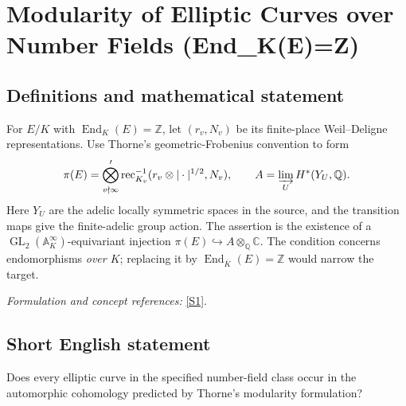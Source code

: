\documentclass[11pt,a4paper]{article}
\newcommand{\Z}{\mathbb{Z}}
\newcommand{\Q}{\mathbb{Q}}
\newcommand{\C}{\mathbb{C}}
\newcommand{\A}{\mathbb{A}}
\newcommand{\sref}[2]{\hyperlink{source:#1:#2}{[S#2]}}
\newif\ifshowcatalogue
\newcommand{\cataloguescope}[1]{\ifshowcatalogue
 \paragraph{Exact scope in the supplied catalogue.}
 \begin{quote}\small #1\end{quote}\fi}
\numberwithin{equation}{section}
\begin{document}
\setcounter{section}{0}
\clearpage
\section*{\texorpdfstring{Modularity of Elliptic Curves over Number Fields (End\_K(E)=Z)}{Modularity of Elliptic Curves over Number Fields (End\_K(E)=Z)}}\label{30006690}
\subsection{Definitions and mathematical statement}
For $E/K$ with $\operatorname{End}_K(E)=\Z$, let $(r_v,N_v)$ be its finite-place Weil--Deligne representations. Use Thorne's geometric-Frobenius convention to form
\[
 \pi(E)=\bigotimes_{v\nmid\infty}'
 \operatorname{rec}_{K_v}^{-1}(r_v\otimes|\cdot|^{1/2},N_v),\qquad
 A=\varinjlim_U H^*(Y_U,\Q).
\]
Here $Y_U$ are the adelic locally symmetric spaces in the source, and the transition maps give the finite-adelic group action. The assertion is the existence of a $\operatorname{GL}_2(\A_K^\infty)$-equivariant injection $\pi(E)\hookrightarrow A\otimes_{\Q}\C$. The condition concerns endomorphisms \emph{over $K$}; replacing it by $\operatorname{End}_{\bar K}(E)=\Z$ would narrow the target.
\par\smallskip\textit{Formulation and concept references:} \sref{30006690}{1}.
\cataloguescope{For every number field K and every elliptic curve E/K with End\_K(E)=Z, prove that pi(E) admits a GL\_2(A\_K\textasciicircum{}infinity)-equivariant injection into A tensor\_Q C, exactly as in Thorne's Conjecture 2.6. Here A is the direct limit over open compact U of H\textasciicircum{}*(Y\_U,Q) for the adelic locally symmetric spaces defined on page 647, and pi(E) is the restricted tensor product at all finite places v of rec\_\{K\_v\}\textasciicircum{}\{-1\}(r\_v tensor |.|\textasciicircum{}\{1/2\},N\_v), with (r\_v,N\_v) attached to E in the source's geometric-Frobenius normalization on pages 646 and 649.}
\subsection{Short English statement}
Does every elliptic curve in the specified number-field class occur in the automorphic cohomology predicted by Thorne's modularity formulation?
\end{document}
